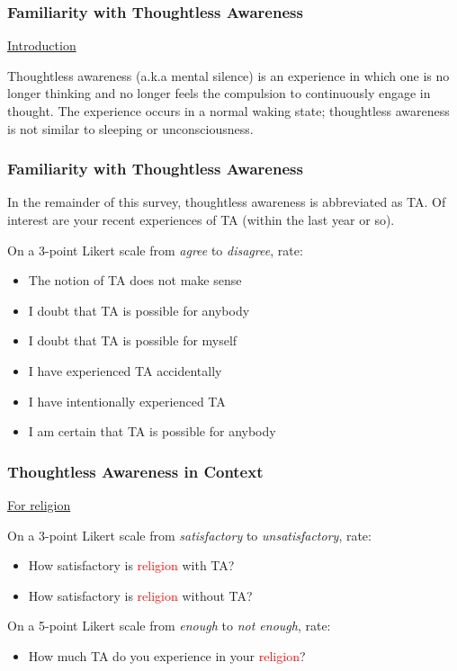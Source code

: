 \documentclass[10pt,utf8x]{beamer}
\begin{document}
\begin{frame}
  \frametitle{Familiarity with Thoughtless Awareness}
{\Large\ul{Introduction}}

Thoughtless awareness (a.k.a mental silence) is an experience in which
one is no longer thinking and no longer feels the compulsion to
continuously engage in thought. The experience occurs in a normal
waking state; thoughtless awareness is not similar to sleeping or
unconsciousness.

\end{frame}

\begin{frame}
  \frametitle{Familiarity with Thoughtless Awareness}

In the remainder of this survey, thoughtless awareness is abbreviated
as TA. Of interest are your recent experiences of TA (within the last
year or so).

On a 3-point Likert scale from \emph{agree} to \emph{disagree}, rate:

\begin{itemize}
\item The notion of TA does not make sense
\item I doubt that TA is possible for anybody
\item I doubt that TA is possible for myself
\item I have experienced TA accidentally
\item I have intentionally experienced TA
\item I am certain that TA is possible for anybody
\end{itemize}

\end{frame}

\begin{frame}
  \frametitle{Thoughtless Awareness in Context}

{\Large\ul{For religion}}

On a 3-point Likert scale from \emph{satisfactory} to
\emph{unsatisfactory}, rate:

\begin{itemize}
\item How satisfactory is \textcolor{red}{religion} with TA?
\item How satisfactory is \textcolor{red}{religion} without TA?
\end{itemize}

On a 5-point Likert scale from \emph{enough} to
\emph{not enough}, rate:

\begin{itemize}
\item How much TA do you experience in your \textcolor{red}{religion}?
\end{itemize}

\end{frame}
\end{document}
